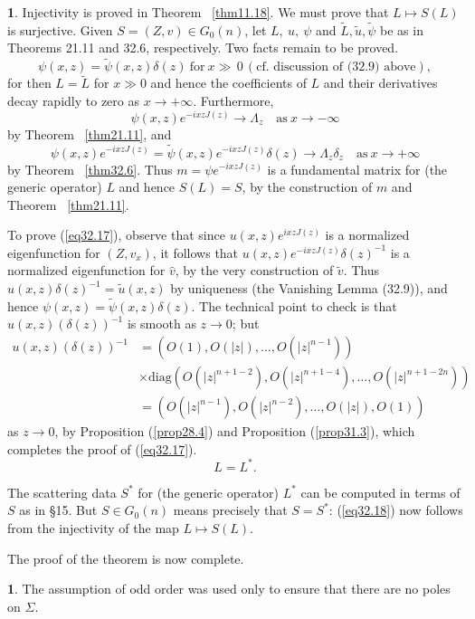 \documentclass{surv-l}
\theoremstyle{plain}
\theoremstyle{definition}
\newtheorem*{pf}{\sc{Proof}}
\newtheorem{remark}[theorem]{\sc{Remark}}
\numberwithin{equation}{chapter}
\begin{document}
\begin{pf}
Injectivity is proved in Theorem ~\ref{thm11.18}. We must prove that $ L\mapsto S(L)$ is surjective. Given $S=(Z, v)\in G_{0}(n)$, let $L,\ u,\ \psi$ and $\tilde{L},\tilde{u},\tilde{\psi}$ be as in Theorems 21.11 and 32.6, respectively. Two facts remain to be proved.
\setcounter{equation}{16}
\begin{equation}\label{eq32.17}
\psi(x,z) =\tilde{\psi}(x, z)\delta(z)\ \mathrm{for}\ x\gg\, 0\,(\text{cf. discussion of (32.9) above}),
\end{equation}
for then $L=\tilde{L}$ for $x\gg 0$ and hence the coefficients of $L$ and their derivatives decay rapidly to zero as $x \rightarrow+\infty$. Furthermore,
\begin{equation*}
\psi(x, z)e^{-ixzJ(z)}\rightarrow\Lambda_{z}\quad \mathrm{as}\  x\rightarrow-\infty
\end{equation*}
by Theorem ~\ref{thm21.11}, and
\begin{equation*}
\psi(x,z)e^{-ixzJ(z)}=\tilde{\psi}(x,z)e^{-ixzJ(z)}\delta(z)\rightarrow\Lambda_{z}\delta_{z}\quad \mathrm{as}\  x\rightarrow+\infty
\end{equation*}
by Theorem ~\ref{thm32.6}. Thus $m=\psi e^{-ixzJ(z)}$ is a fundamental matrix for (the generic operator) $L$ and hence $S(L)=S$, by the construction of $m$ and Theorem ~\ref{thm21.11}.

To prove (\ref{eq32.17}), observe that since $u(x,z)e^{ixzJ(z)}$ is a normalized eigenfunction for $(Z, v_{x})$, it follows that $u(x, z)e^{-ixzJ(z)}\delta(z)^{-1}$ is a normalized eigenfunction for $\hat{v}$, by the very construction of $\tilde{v}$. Thus $u(x, z)\delta(z)^{-1}=\tilde{u}(x, z)$ by uniqueness (the Vanishing Lemma (32.9)), and hence $\psi(x, z)=\tilde{\psi}(x, z)\delta(z)$. The technical point to check is that $u(x, z)(\delta(z))^{-1}$ is smooth as $z\rightarrow 0$; but
\begin{align*}
u(x, z)(\delta(z))^{-1}&=(O(1), O(|z|),\ldots,O(|z|^{n-1}))\\
&\times \mathrm{diag} (O(|z|^{n+1-2}),O(|z|^{n+1-4}),\ldots,O(|z|^{n+1-2n}))\\
&=(O(|z|^{n-1}), O(|z|^{n-2}),\ldots,O(|z|),O(1))
\end{align*}
as $z\rightarrow 0$, by Proposition (\ref{prop28.4}) and Proposition (\ref{prop31.3}), which completes the proof of (\ref{eq32.17}).
\setcounter{equation}{17}
\begin{equation}\label{eq32.18}
L=L^{*}.
\end{equation}

The scattering data $S^{*}$ for (the generic operator) $L^{*}$ can be computed in terms of $S$ as in \S 15. But $S\in G_{0}(n)$ means precisely that $S=S^{*}$: (\ref{eq32.18}) now follows from the injectivity of the map $L\mapsto S(L)$.

The proof of the theorem is now complete. \qquad
\end{pf}
\setcounter{theorem}{18}
\begin{remark}\label{rem32.19}
The assumption of odd order was used only to ensure that there are no poles on $\Sigma$.
\end{remark}
\end{document}
